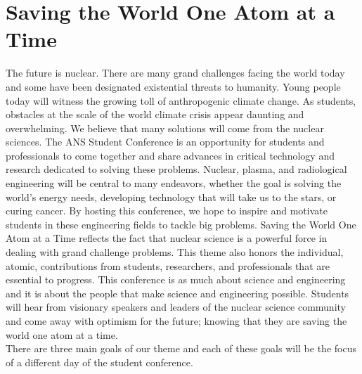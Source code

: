 \section{Saving the World One Atom at a Time}
The future is nuclear. There are many grand challenges facing the world today and some have been designated existential threats to humanity. Young people today will witness the growing toll of anthropogenic climate change. As students, obstacles at the scale of the world climate crisis appear daunting and overwhelming. We believe that many solutions will come from the nuclear sciences. The ANS Student Conference is an opportunity for students and professionals to come together and share advances in critical technology and research dedicated to solving these problems. Nuclear, plasma, and radiological engineering will be central to many endeavors, whether the goal is solving the world’s energy needs, developing technology that will take us to the stars, or curing cancer. By hosting this conference, we hope to inspire and motivate students in these engineering fields to tackle big problems. Saving the World One Atom at a Time reflects the fact that nuclear science is a powerful force in dealing with grand challenge problems. This theme also honors the individual, atomic, contributions from students, researchers, and professionals that are essential to progress. This conference is as much about science and engineering and it is about the people that make science and engineering possible. Students will hear from visionary speakers and leaders of the nuclear science community and come away with optimism for the future; knowing that they are saving the world one atom at a time.\\
There are three main goals of our theme and each of these goals will be the focus of a different day of the student conference.

